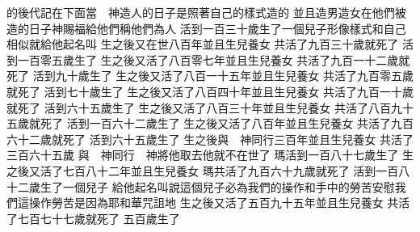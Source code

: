 \bchapter%
的後代\chientien{}記在下面\chuan 當　神造人的日子\chientien 是照著自己的樣式造的\chientien 
{}並且造男造女\chientien 在他們被造的日子{\chientien}\hspace{0pt}{　}神賜福給他們\chientien 稱他們為人\chuan 
{}活到一百三十歲\chientien 生了一個兒子\chientien 形像樣式和自己相似\chientien 就給他起名叫\chuan 
{}生之後\chientien 又在世八百年\yuentien 並且生兒養女\chuan 
{}共活了九百三十歲就死了\chuan\Chuan
{}活到一百零五歲\chientien 生了\chuan 
{}生之後\chientien 又活了八百零七年\yuentien 並且生兒養女\chuan 
{}共活了九百一十二歲就死了\chuan\Chuan
{}活到九十歲\chientien 生了\chuan 
{}生之後\chientien 又活了八百一十五年\yuentien 並且生兒養女\chuan 
{}共活了九百零五歲就死了\chuan\Chuan
{}活到七十歲\chientien 生了\chuan 
{}生之後\chientien 又活了八百四十年\yuentien 並且生兒養女\chuan 
{}共活了九百一十歲就死了\chuan\Chuan
{}活到六十五歲\chientien 生了\chuan 
{}生之後\chientien 又活了八百三十年\yuentien 並且生兒養女\chuan 
{}共活了八百九十五歲就死了\chuan\Chuan
{}活到一百六十二歲\chientien 生了\chuan 
{}生之後\chientien 又活了八百年\yuentien 並且生兒養女\chuan 
{}共活了九百六十二歲就死了\chuan\Chuan
{}活到六十五歲\chientien 生了\chuan 
{}生之後\chientien 與　神同行三百年\yuentien 並且生兒養女\chuan 
{}共活了三百六十五歲\chuan 
{}與　神同行\chientien 　神將他取去\chientien 他就不在世了\chuan\Chuan
{}瑪活到一百八十七歲\chientien 生了\chuan 
{}生之後\chientien 又活了七百八十二年\yuentien 並且生兒養女\chuan 
{}瑪共活了九百六十九歲就死了\chuan\Chuan
{}活到一百八十二歲\chientien 生了一個兒子\chientien 
{}給他起名叫\chientien 說\chientien 這個兒子必為我們的操作\chientien 和手中的勞苦\chientien 安慰我們\yuentien 這操作勞苦是因為耶和華咒詛地\chuan 
{}生之後\chientien 又活了五百九十五年\yuentien 並且生兒養女\chuan 
{}共活了七百七十七歲就死了\chuan 
{}五百歲生了\chientien{}\chientien{}\chuan 
